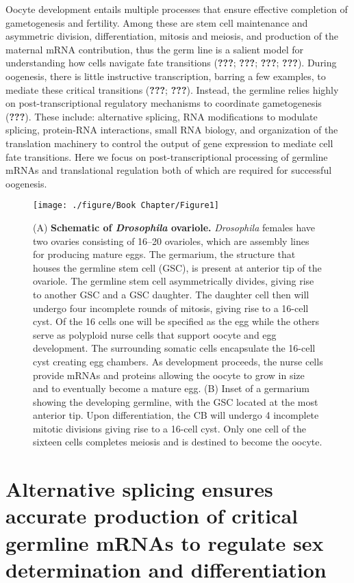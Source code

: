 \documentclass[12pt,oneside]{reedthesis}
\begin{document}
Oocyte development entails multiple processes that ensure effective
completion of gametogenesis and fertility. Among these are stem cell
maintenance and asymmetric division, differentiation, mitosis and
meiosis, and production of the maternal mRNA contribution, thus the germ
line is a salient model for understanding how cells navigate fate
transitions ({\textbf{???}}; {\textbf{???}}; {\textbf{???}}; {\textbf{???}}).
During oogenesis, there is little instructive transcription, barring a
few examples, to mediate these critical transitions ({\textbf{???}}; {\textbf{???}}). Instead, the germline relies highly on
post-transcriptional regulatory mechanisms to coordinate gametogenesis
({\textbf{???}}). These include: alternative splicing, RNA
modifications to modulate splicing, protein-RNA interactions, small RNA
biology, and organization of the translation machinery to control the
output of gene expression to mediate cell fate transitions. Here we
focus on post-transcriptional processing of germline mRNAs and
translational regulation both of which are required for successful
oogenesis.
\begin{figure}

{\centering \texttt{[image: ./figure/Book Chapter/Figure1]} 

}

\caption[\textbf{Schematic of \emph{Drosophila} ovariole.}]{(A) \textbf{Schematic of \emph{Drosophila} ovariole.} \emph{Drosophila} females have two ovaries consisting of 16--20 ovarioles, which are assembly lines for producing mature eggs. The germarium, the structure that houses the germline stem cell (GSC), is present at anterior tip of the ovariole. The germline stem cell asymmetrically divides, giving rise to another GSC and a GSC daughter. The daughter cell then will undergo four incomplete rounds of mitosis, giving rise to a 16-cell cyst. Of the 16 cells one will be specified as the egg while the others serve as polyploid nurse cells that support oocyte and egg development. The surrounding somatic cells encapsulate the 16-cell cyst creating egg chambers. As development proceeds, the nurse cells provide mRNAs and proteins allowing the oocyte to grow in size and to eventually become a mature egg. (B) Inset of a germarium showing the developing germline, with the GSC located at the most anterior tip. Upon differentiation, the CB will undergo 4 incomplete mitotic divisions giving rise to a 16-cell cyst. Only one cell of the sixteen cells completes meiosis and is destined to become the oocyte.}\label{fig:unnamed-chunk-2}
\end{figure}
\hypertarget{alternative-splicing-ensures-accurate-production-of-critical-germline-mrnas-to-regulate-sex-determination-and-differentiation}{%
\section{Alternative splicing ensures accurate production of critical germline mRNAs to regulate sex determination and differentiation}\label{alternative-splicing-ensures-accurate-production-of-critical-germline-mrnas-to-regulate-sex-determination-and-differentiation}}
\end{document}
